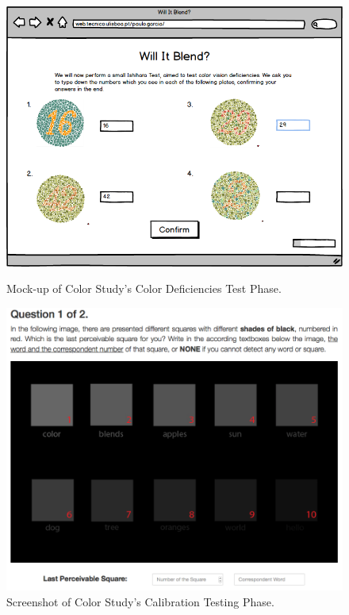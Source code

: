 %
\begin{figure}[htbp]
  \centering
  \begin{minipage}{0.49\textwidth}
		\centering
	  \includegraphics[width=\textwidth]{images/implementation/mockup_ishihara.png}
	  \caption[Mock-up of Color Study's Color Deficiencies Test Phase.]{Mock-up of Color Study's Color Deficiencies Test Phase.}
	  \label{fig:mockup_ishihara}
  \end{minipage} \hfill
	\begin{minipage}{0.49\textwidth}
		\centering
		\includegraphics[width=\textwidth]{images/implementation/screen_calibration.png}
		\caption[Screenshot of Color Study's Calibration Testing Phase.]{Screenshot of Color Study's Calibration Testing Phase.}
		\label{fig:screen_ishihara}
	\end{minipage}
\end{figure} \par
